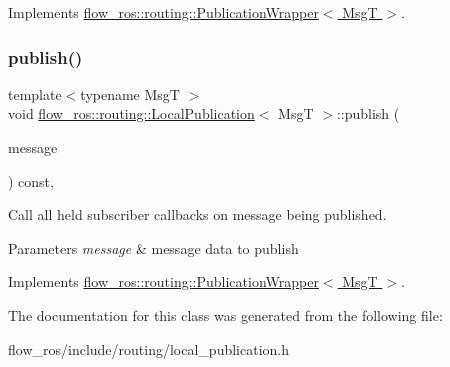 Implements \hyperlink{classflow__ros_1_1routing_1_1_publication_wrapper_afc33bf27092f8e8188e3f7955a6b7c97}{flow\+\_\+ros\+::routing\+::\+Publication\+Wrapper$<$ Msg\+T $>$}.

\mbox{\label{classflow__ros_1_1routing_1_1_local_publication_ab2d53a2bd93e83ee11095f35d5820226}} 
\subsubsection{\texorpdfstring{publish()}{publish()}}
{\footnotesize\ttfamily template$<$typename MsgT $>$ \\
void \hyperlink{classflow__ros_1_1routing_1_1_local_publication}{flow\+\_\+ros\+::routing\+::\+Local\+Publication}$<$ MsgT $>$\+::publish (\begin{DoxyParamCaption}\item[{const \hyperlink{namespaceflow__ros_a21a684f38ee2083b3858613317c46d82}{message\+\_\+shared\+\_\+ptr\+\_\+t}$<$ MsgT $>$ \&}]{message }\end{DoxyParamCaption}) const\hspace{0.3cm}{\ttfamily [inline]}, {\ttfamily [virtual]}}



Call all held subscriber callbacks on message being published. 


\begin{DoxyParams}{Parameters}
{\em message} & message data to publish \\
\hline
\end{DoxyParams}


Implements \hyperlink{classflow__ros_1_1routing_1_1_publication_wrapper_a43b9989390bf9f001fe9670a0c1d5897}{flow\+\_\+ros\+::routing\+::\+Publication\+Wrapper$<$ Msg\+T $>$}.



The documentation for this class was generated from the following file\+:\begin{DoxyCompactItemize}
\item 
flow\+\_\+ros/include/routing/local\+\_\+publication.\+h\end{DoxyCompactItemize}
